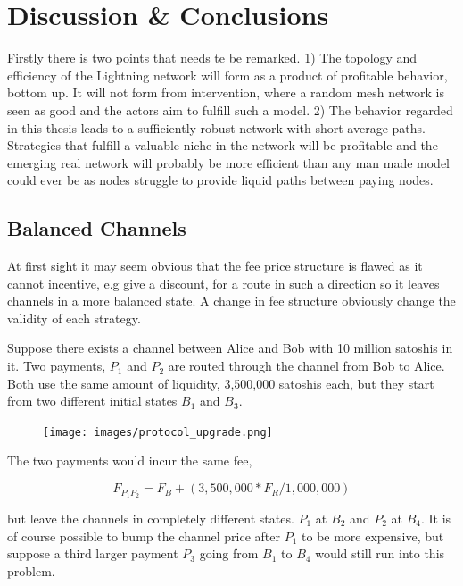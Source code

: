 \chapter{Discussion \& Conclusions}

Firstly there is two points that needs te be remarked. 1) The topology and efficiency of the Lightning network will form as a product of profitable behavior, bottom up. It will not form from intervention, where a random mesh network is seen as good and the actors aim to fulfill such a model. 2) The behavior regarded in this thesis leads to a sufficiently robust network with short average paths. Strategies that fulfill a valuable niche in the network will be profitable and the emerging real network will probably be more efficient than any man made model could ever be as nodes struggle to provide liquid paths between paying nodes.

\section{Balanced Channels}

At first sight it may seem obvious that the fee price structure is flawed as it cannot incentive, e.g give a discount, for a route in such a direction so it leaves channels in a more balanced state. A change in fee structure obviously change the validity of each strategy.

Suppose there exists a channel between Alice and Bob with 10 million satoshis in it. 
Two payments, $P_{1}$ and $P_{2}$ are routed through the channel from Bob to Alice.
Both use the same amount of liquidity, 3,500,000 satoshis each, but they start from two different initial states $B_{1}$ and $B_3$.

\begin{figure}[!htb]
	\hspace*{0.7cm} 
	\centering
	\texttt{[image: images/protocol\_upgrade.png]}
	
	\label{fig:upgrade}
	\hspace*{2mm} 	
\end{figure}

The two payments would incur the same fee, 

\[ F_{P_1 P_2} = F_B + (3,500,000 * F_R / 1,000,000) \]

but leave the channels in completely different states. $P_1$ at $B_2$ and $P_2$ at $B_4$. It is of course possible to bump the channel price after $P_1$ to
be more expensive, but suppose a third larger payment $P_3$ going from $B_1$ to $B_4$ would still run into this problem.

